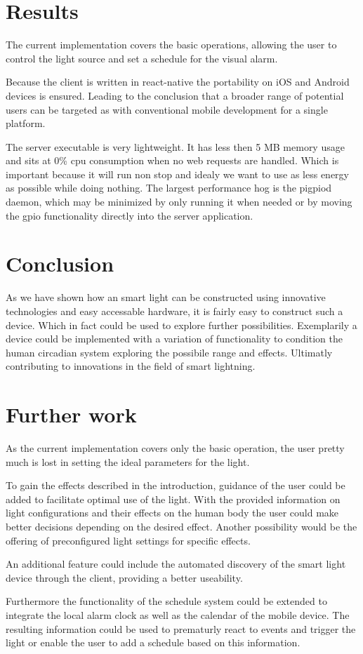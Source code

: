 \documentclass[conference]{IEEEtran}
\begin{document}
\section{Results}
The current implementation covers the basic operations, allowing the user to control the light source and set a schedule
for the visual alarm. 

Because the client is written in react-native the portability on iOS and Android devices is ensured. Leading to the conclusion
that a broader range of potential users can be targeted as with conventional mobile development for a single platform.

The server executable is very lightweight. It has less then 5 MB memory usage and sits at 0\% cpu consumption when no web
requests are handled. Which is important because it will run non stop and idealy we want to use as less energy as possible while
doing nothing. The largest performance hog is the pigpiod daemon, which may be minimized by only running it when needed or by moving
the gpio functionality directly into the server application. 


\section{Conclusion}
As we have shown how an smart light can be constructed using innovative technologies and easy accessable hardware, it is fairly
easy to construct such a device. Which in fact could be used to explore further possibilities. Exemplarily a device could be
implemented with a variation of functionality to condition the human circadian system exploring the possibile range and effects.
Ultimatly contributing to innovations in the field of smart lightning.


\section{Further work}
As the current implementation covers only the basic operation, the user pretty much is lost in setting the ideal parameters
for the light.

To gain the effects described in the introduction, guidance of the user could be added to facilitate
optimal use of the light. With the provided information on light configurations and their effects on the human body
the user could make better decisions depending on the desired effect. Another possibility would be the offering of preconfigured
light settings for specific effects.

An additional feature could include the automated discovery of the smart light device through the client, providing a 
better useability. 

Furthermore the functionality of the schedule system could be extended to integrate the local alarm clock as well as the calendar
of the mobile device. The resulting information could be used to prematurly react to events and trigger the light or enable the user
to add a schedule based on this information. 




\end{document}
